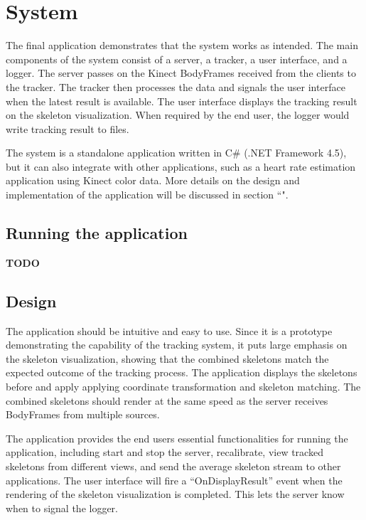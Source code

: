 \section{System}
\label{sec:system}

The final application demonstrates that the system works as intended. The main components of the system consist of a server, a tracker, a user interface, and a logger. The server passes on the Kinect BodyFrames received from the clients to the tracker. The tracker then processes the data and signals the user interface when the latest result is available. The user interface displays the tracking result on the skeleton visualization. When required by the end user, the logger would write tracking result to files.

The system is a standalone application written in C\# (.NET Framework 4.5), but it can also integrate with other applications, such as a heart rate estimation application using Kinect color data. More details on the design and implementation of the application will be discussed in section ``".

\subsection{Running the application}

\textbf{TODO}

\subsection{Design}

The application should be intuitive and easy to use. Since it is a prototype demonstrating the capability of the tracking system, it puts large emphasis on the skeleton visualization, showing that the combined skeletons match the expected outcome of the tracking process. The application displays the skeletons before and apply applying coordinate transformation and skeleton matching. The combined skeletons should render at the same speed as the server receives BodyFrames from multiple sources. 

The application provides the end users essential functionalities for running the application, including start and stop the server, recalibrate, view tracked skeletons from different views, and send the average skeleton stream to other applications. The user interface will fire a ``OnDisplayResult'' event when the rendering of the skeleton visualization is completed. This lets the server know when to signal the logger.

